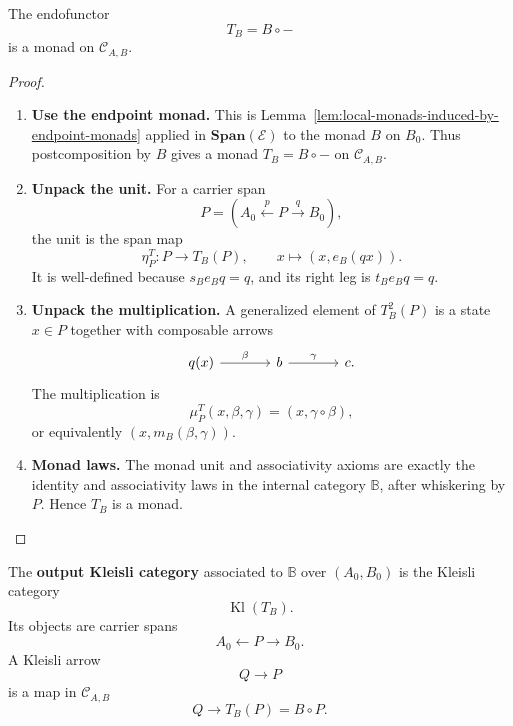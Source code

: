 \begin{proposition}
\label{prop:output-comparison-monad}
    The endofunctor
    \[
        T_B=B\circ-
    \]
    is a monad on \(\mathcal C_{A,B}\).
\end{proposition}
\begin{proof}
    \leavevmode
    \begin{enumerate}
        \item \textbf{Use the endpoint monad.} This is Lemma~\ref{lem:local-monads-induced-by-endpoint-monads} applied in \(\mathbf{Span}(\mathcal E)\) to the monad \(B\) on \(B_0\). Thus postcomposition by \(B\) gives a monad \(T_B=B\circ-\) on \(\mathcal C_{A,B}\).

        \item \textbf{Unpack the unit.} For a carrier span
        \[
            P=
            \left(
                A_0
                \xleftarrow{p}
                P
                \xrightarrow{q}
                B_0
            \right),
        \]
        the unit is the span map
        \[
            \eta^T_P:P\to T_B(P),
            \qquad
            x\longmapsto (x,e_B(qx)).
        \]
        It is well-defined because \(s_Be_Bq=q\), and its right leg is \(t_Be_Bq=q\).

        \item \textbf{Unpack the multiplication.} A generalized element of \(T_B^2(P)\) is a state \(x\in P\) together with composable arrows
        \[
            \begin{tikzcd}[column sep=large]
                    q(x) 
                        \arrow[r, "\beta"] 
                & 
                    b 
                        \arrow[r, "\gamma"] 
                & 
                    c.
            \end{tikzcd}
        \]
        The multiplication is
        \[
            \mu^T_P(x,\beta,\gamma)=(x,\gamma\circ\beta),
        \]
        or equivalently \((x,m_B(\beta,\gamma))\).

        \item \textbf{Monad laws.} The monad unit and associativity axioms are exactly the identity and associativity laws in the internal category \(\mathbb B\), after whiskering by \(P\). Hence \(T_B\) is a monad.
    \end{enumerate}
\end{proof}

\begin{definition}
\label{def:kleisli-output-category}
    The \textbf{output Kleisli category} associated to \(\mathbb B\) over \((A_0,B_0)\) is the Kleisli category
    \[
        \operatorname{Kl}(T_B).
    \]
    Its objects are carrier spans
    \[
        A_0\xleftarrow{}P\xrightarrow{}B_0.
    \]
    A Kleisli arrow
    \[
        Q\to P
    \]
    is a map in \(\mathcal C_{A,B}\)
    \[
        Q\to T_B(P)=B\circ P.
    \]
\end{definition}

